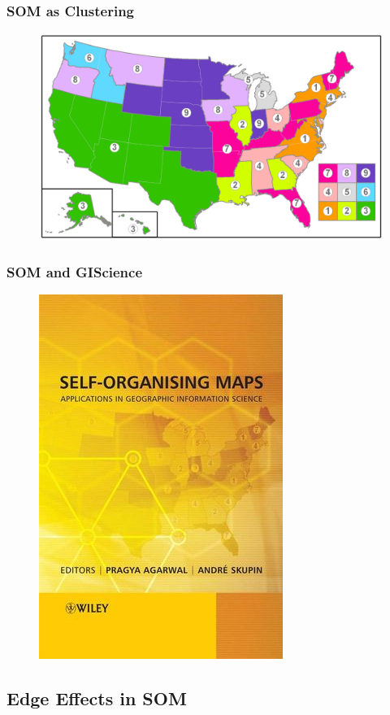 \documentclass[nototal,handout]{beamer}
\begin{document}
\begin{frame}
	\frametitle{SOM as Clustering}
  \begin{center}
  \begin{figure}
  \includegraphics[width=0.90\linewidth]{clustermap.png}
  \end{figure}
  \end{center}
 \end{frame} 

\begin{frame}
	\frametitle{SOM and GIScience}
  \begin{center}
  \begin{figure}
  \includegraphics[width=0.50\linewidth]{book.png}
  \end{figure}
  \end{center}
 \end{frame} 

\subsection{Edge Effects in SOM} 
\end{document}
